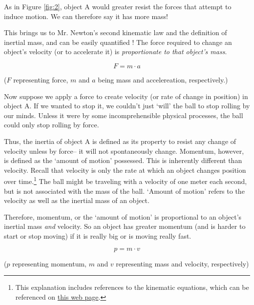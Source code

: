 \documentclass{article}
\begin{document}
                As in Figure \ref{fig:2}, object A would greater resist the forces that attempt to induce motion. We can therefore say it has more mass! 
                \par
                This brings us to Mr. Newton's second kinematic law and the definition of inertial mass, and can be easily quantified \cite{Newton}! The force required to change an object's velocity (or to accelerate it) is \emph{proportionate to that object's mass}.

                \begin{equation}\label{eq:1}
                    F = m \cdot a
                \end{equation}
                \begin{center}
                    ($F$ representing force, $m$ and $a$ being mass and accelereation, respectively.)
                \end{center}
                
                Now suppose we apply a force to create velocity (or rate of change in position) in object A.
                If we wanted to stop it, we couldn't just `will' the ball to stop rolling by our minds. Unless it were by some incomprehensible physical processes, the ball could only stop rolling by force.
                
                Thus, the inertia of object A is defined as its property to resist any change of velocity unless by force-- it will not spontaneously change. Momentum, however, is defined as the `amount of motion' possessed. 
                This is inherently different than velocity. Recall that velocity is only the rate at which an object changes position over time.\footnote{This explanation includes references to the kinematic equations, which can be referenced on \href{https://byjus.com/physics/kinematics-equations/}{this web page}.} 
                The ball might be traveling with a velocity of one meter each second, but is not associated with the mass of the ball. `Amount of motion' refers to the velocity as well as the inertial mass of an object.
                
                Therefore, momentum, or the `amount of motion' is proportional to an object's inertial mass \emph{and} velocity. So an object has greater momentum (and is harder to start or stop moving) if it is really big or is moving really fast. 

                \begin{equation}\label{eq:2}
                    p = m \cdot v
                \end{equation}
                \begin{center}
                    ($p$ representing momentum, $m$ and $v$ representing mass and velocity, respectively)
                \end{center}
\end{document}
